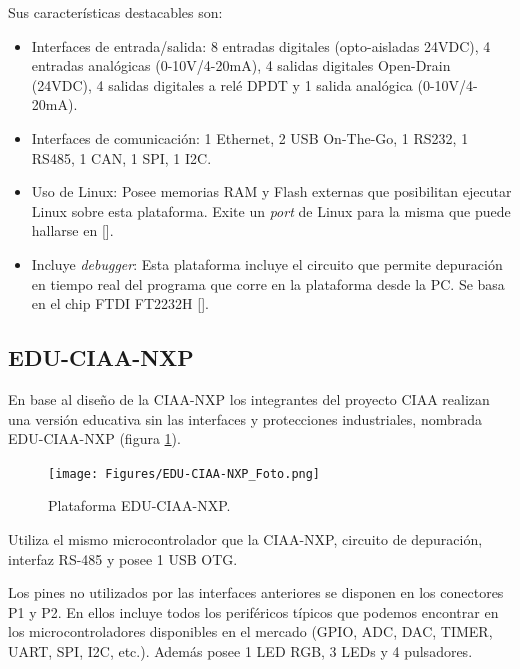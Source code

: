 Sus características destacables son:

\begin{itemize}
\item
Interfaces de entrada/salida: 8 entradas digitales (opto-aisladas 24VDC), 4 entradas analógicas (0-10V/4-20mA), 4 salidas digitales Open-Drain (24VDC), 4 salidas digitales a relé DPDT y 1 salida analógica (0-10V/4-20mA).
\item
Interfaces de comunicación: 1 Ethernet, 2 USB On-The-Go, 1 RS232, 1 RS485, 1 CAN, 1 SPI, 1 I2C.
\item
Uso de Linux: Posee memorias RAM y Flash externas que posibilitan ejecutar Linux sobre esta plataforma. Exite un \emph{port} de Linux para la misma que puede hallarse en [].
\item
Incluye \emph{debugger}: Esta plataforma incluye el circuito que permite depuración en tiempo real del programa que corre en la plataforma desde la PC. Se basa en el chip FTDI FT2232H [].
\end{itemize}


\subsection{EDU-CIAA-NXP}

En base al diseño de la CIAA-NXP los integrantes del proyecto CIAA realizan una versión educativa sin las interfaces y protecciones industriales, nombrada EDU-CIAA-NXP (figura \ref{fig:eduCiaa}).

\begin{figure}[!htbp]
\begin{center}  %
\texttt{[image: Figures/EDU-CIAA-NXP\_Foto.png]}
\par\caption{Plataforma EDU-CIAA-NXP.}\label{fig:eduCiaa}
\end{center}
\end{figure}

Utiliza el mismo microcontrolador que la CIAA-NXP, circuito de depuración, interfaz RS-485 y posee 1 USB OTG.

Los pines no utilizados por las interfaces anteriores se disponen en los conectores P1 y P2. En ellos incluye todos los periféricos típicos que podemos encontrar en los microcontroladores disponibles en el mercado (GPIO, ADC, DAC, TIMER, UART, SPI, I2C, etc.). Además posee 1 LED RGB, 3 LEDs y 4 pulsadores.

